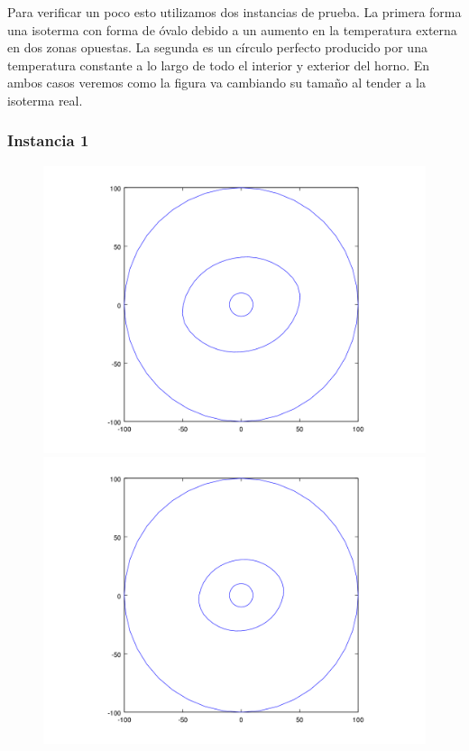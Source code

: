Para verificar un poco esto utilizamos dos instancias de prueba. La primera forma una isoterma con forma de óvalo debido a un aumento en la temperatura externa en dos zonas opuestas. La segunda es un círculo perfecto producido por una temperatura constante a lo largo de todo el interior y exterior del horno. En ambos casos veremos como la figura va cambiando su tamaño al tender a la isoterma real.

\subsubsection{Instancia 1}

\begin{figure}[H]
\centering
\begin{minipage}{0.48\textwidth}
  \centering
    \includegraphics[width=1\textwidth]{imgs/comp_rads_bueno/comp_radss_iso5.png}
  \caption{}
  \label{fig:Radios1}
\end{minipage}%
\hspace{0.03\textwidth}
\begin{minipage}{0.48\textwidth}   
  \centering
    \includegraphics[width=1\textwidth]{imgs/comp_rads_bueno/comp_radss_iso0.png} 
    \caption{} 
  \label{fig:Radios2}
\end{minipage}
\end{figure}



